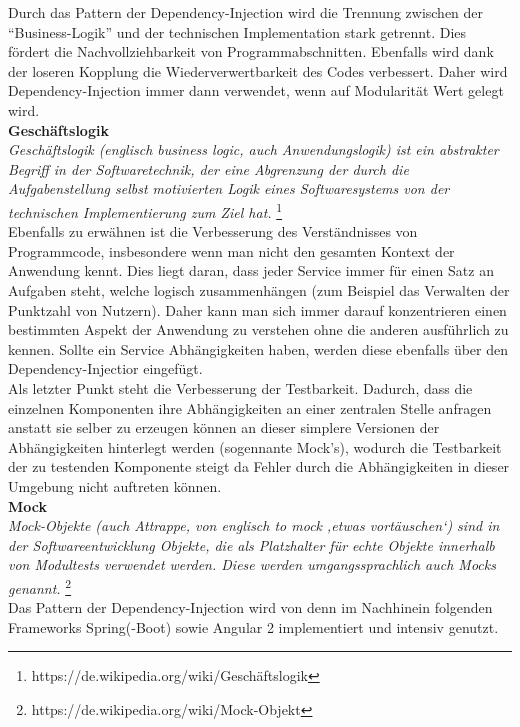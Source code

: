 Durch das Pattern der Dependency-Injection wird die Trennung zwischen der ``Business-Logik'' und der technischen Implementation stark getrennt. Dies fördert die Nachvollziehbarkeit von Programmabschnitten. Ebenfalls wird dank der loseren Kopplung die Wiederverwertbarkeit des Codes verbessert. Daher wird Dependency-Injection immer dann verwendet, wenn auf Modularität Wert gelegt wird. \\


\textbf{Geschäftslogik} \\
\emph{\glqq   
Geschäftslogik (englisch business logic, auch Anwendungslogik) ist ein abstrakter Begriff in der Softwaretechnik, der eine Abgrenzung der durch die Aufgabenstellung selbst motivierten Logik eines Softwaresystems von der technischen Implementierung zum Ziel hat.
\grqq} \footnote{https://de.wikipedia.org/wiki/Geschäftslogik} \\

Ebenfalls zu erwähnen ist die Verbesserung des Verständnisses von Programmcode, insbesondere wenn man nicht den gesamten Kontext der Anwendung kennt. Dies liegt daran, dass jeder Service immer für einen Satz an Aufgaben steht, welche logisch zusammenhängen (zum Beispiel das Verwalten der Punktzahl von Nutzern). Daher kann man sich immer darauf konzentrieren einen bestimmten Aspekt der Anwendung zu verstehen ohne die anderen ausführlich zu kennen. Sollte ein Service Abhängigkeiten haben, werden diese ebenfalls über den Dependency-Injectior eingefügt. \\

Als letzter Punkt steht die Verbesserung der Testbarkeit. Dadurch, dass die einzelnen Komponenten ihre Abhängigkeiten an einer zentralen Stelle anfragen anstatt sie selber zu erzeugen können an dieser simplere Versionen der Abhängigkeiten hinterlegt werden (sogennante Mock's), wodurch die Testbarkeit der zu testenden Komponente steigt da Fehler durch die Abhängigkeiten in dieser Umgebung nicht auftreten können. \\

\newpage
\textbf{Mock} \\
\emph{\glqq   
Mock-Objekte (auch Attrappe, von englisch to mock ‚etwas vortäuschen‘) sind in der Softwareentwicklung Objekte, die als Platzhalter für echte Objekte innerhalb von Modultests verwendet werden. Diese werden umgangssprachlich auch Mocks genannt.
\grqq} \footnote{https://de.wikipedia.org/wiki/Mock-Objekt} \\

Das Pattern der Dependency-Injection wird von denn im Nachhinein folgenden Frameworks Spring(-Boot) sowie Angular 2 implementiert und intensiv genutzt.

